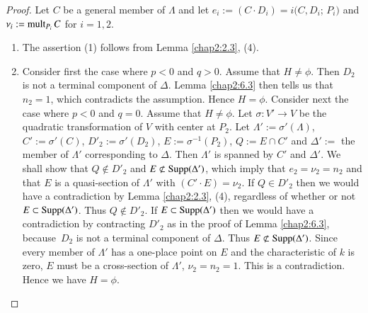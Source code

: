 \begin{proof}
Let $C$ be a general member of $\Lambda$ and let $e_{i}:=(C\cdot
D_{i})=i(C,D_{i}$; $P_{i})$ and $\nu_{i}:=\operatorname{mult}_{P_{i}}C$ for $i=1,2$.
\begin{enumerate}
\renewcommand{\labelenumi}{\rm(\theenumi)}
\item The assertion (1) follows from Lemma \ref{chap2:2.3}, (4).

\item Consider first the case where $p<0$ and $q>0$. Assume that
  $H\neq \phi$. Then $D_{2}$ is not a terminal component of
  $\Delta$. Lemma \ref{chap2:6.3} then tells us that $n_{2}=1$, which
  contradicts the assumption. Hence $H=\phi$. Consider next the case
  where $p<0$ and $q=0$. Assume that $H\neq \phi$. Let $\sigma:V'\to
  V$ be the quadratic transformation of $V$ with center at
  $P_{2}$. Let $\Lambda':=\sigma'(\Lambda)$, $C':=\sigma'(C)$,
  $D'_{2}:=\sigma'(D_{2})$, $E:=\sigma^{-1}(P_{2})$, $Q:=E\cap C'$ and
  $\Delta':=$ the member of $\Lambda'$ corresponding to $\Delta$. Then
  $\Lambda'$ is spanned by $C'$ and $\Delta'$. We shall show that
  $Q\not\in D'_{2}$ and $E\not\subset \operatorname{Supp}(\Delta')$, which imply
  that $e_{2}=\nu_{2}=n_{2}$ and that $E$ is a quasi-section of
  $\Lambda'$ with $(C'\cdot E)=\nu_{2}$. If $Q\in D'_{2}$ then we
  would have a contradiction by Lemma \ref{chap2:2.3}, (4), regardless of
  whether or not $E\subset \operatorname{Supp}(\Delta')$. Thus $Q\not\in D'_{2}$. If
  $E\subset \operatorname{Supp}(\Delta')$ then we would have a contradiction by
  contracting $D'_{2}$ as in the proof of Lemma \ref{chap2:6.3},
  because\pageoriginale\ $D_{2}$ is not a terminal component of
  $\Delta$. Thus $E\not\subset \operatorname{Supp}(\Delta')$. Since every member of
  $\Lambda'$ has a one-place point on $E$ and the characteristic of
  $k$ is zero, $E$ must be a cross-section of $\Lambda'$, \iec
  $\nu_{2}=n_{2}=1$. This is a contradiction. Hence we have $H=\phi$. 


\end{enumerate}
\end{proof}
